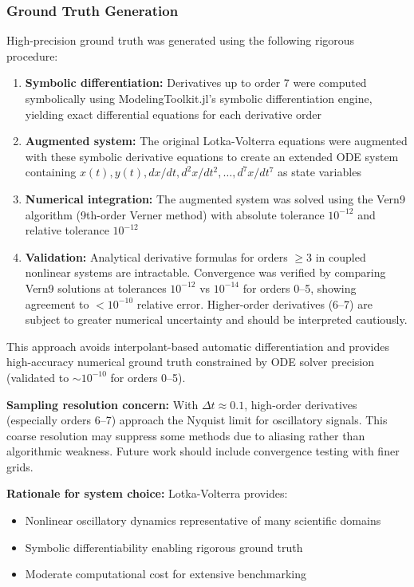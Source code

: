 \subsubsection{Ground Truth Generation}

High-precision ground truth was generated using the following rigorous procedure:

\begin{enumerate}
    \item \textbf{Symbolic differentiation:} Derivatives up to order 7 were computed symbolically using ModelingToolkit.jl's symbolic differentiation engine, yielding exact differential equations for each derivative order
    \item \textbf{Augmented system:} The original Lotka-Volterra equations were augmented with these symbolic derivative equations to create an extended ODE system containing $x(t), y(t), dx/dt, d^2x/dt^2, \ldots, d^7x/dt^7$ as state variables
    \item \textbf{Numerical integration:} The augmented system was solved using the Vern9 algorithm (9th-order Verner method) with absolute tolerance $10^{-12}$ and relative tolerance $10^{-12}$
    \item \textbf{Validation:} Analytical derivative formulas for orders $\geq 3$ in coupled nonlinear systems are intractable. Convergence was verified by comparing Vern9 solutions at tolerances $10^{-12}$ vs $10^{-14}$ for orders 0--5, showing agreement to $<10^{-10}$ relative error. Higher-order derivatives (6--7) are subject to greater numerical uncertainty and should be interpreted cautiously.
\end{enumerate}

This approach avoids interpolant-based automatic differentiation and provides high-accuracy numerical ground truth constrained by ODE solver precision (validated to $\sim 10^{-10}$ for orders 0--5).

\textbf{Sampling resolution concern:} With $\Delta t \approx 0.1$, high-order derivatives (especially orders 6--7) approach the Nyquist limit for oscillatory signals. This coarse resolution may suppress some methods due to aliasing rather than algorithmic weakness. Future work should include convergence testing with finer grids.

\textbf{Rationale for system choice:} Lotka-Volterra provides:
\begin{itemize}
    \item Nonlinear oscillatory dynamics representative of many scientific domains
    \item Symbolic differentiability enabling rigorous ground truth
    \item Moderate computational cost for extensive benchmarking
\end{itemize}

